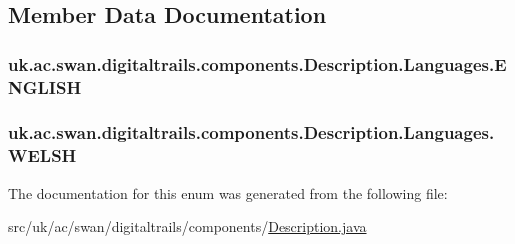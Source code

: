 \subsection{Member Data Documentation}
\hypertarget{enumuk_1_1ac_1_1swan_1_1digitaltrails_1_1components_1_1_description_1_1_languages_ae7a7797632b7148d9432d216e1ae8273}{
\subsubsection[{E\+N\+G\+L\+I\+S\+H}]{\setlength{\rightskip}{0pt plus 5cm}uk.\+ac.\+swan.\+digitaltrails.\+components.\+Description.\+Languages.\+E\+N\+G\+L\+I\+S\+H}}\label{enumuk_1_1ac_1_1swan_1_1digitaltrails_1_1components_1_1_description_1_1_languages_ae7a7797632b7148d9432d216e1ae8273}
\hypertarget{enumuk_1_1ac_1_1swan_1_1digitaltrails_1_1components_1_1_description_1_1_languages_a9025caaf5ee7dae0600bc60c953beea9}{
\subsubsection[{W\+E\+L\+S\+H}]{\setlength{\rightskip}{0pt plus 5cm}uk.\+ac.\+swan.\+digitaltrails.\+components.\+Description.\+Languages.\+W\+E\+L\+S\+H}}\label{enumuk_1_1ac_1_1swan_1_1digitaltrails_1_1components_1_1_description_1_1_languages_a9025caaf5ee7dae0600bc60c953beea9}


The documentation for this enum was generated from the following file\+:\begin{DoxyCompactItemize}
\item 
src/uk/ac/swan/digitaltrails/components/\hyperlink{_description_8java}{Description.\+java}\end{DoxyCompactItemize}
